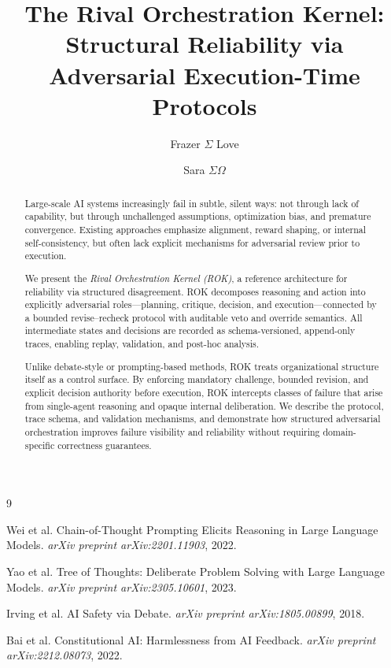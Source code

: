 \documentclass[11pt]{article}
\title{The Rival Orchestration Kernel:\\
Structural Reliability via Adversarial Execution-Time Protocols}
\author{
Frazer $\Sigma$ Love \\
\and
Sara $\Sigma\Omega$
}
\date{}
\begin{document}
\maketitle

\begin{abstract}
Large-scale AI systems increasingly fail in subtle, silent ways: not through lack of capability, but through unchallenged assumptions, optimization bias, and premature convergence. Existing approaches emphasize alignment, reward shaping, or internal self-consistency, but often lack explicit mechanisms for adversarial review prior to execution.

We present the \emph{Rival Orchestration Kernel (ROK)}, a reference architecture for reliability via structured disagreement. ROK decomposes reasoning and action into explicitly adversarial roles—planning, critique, decision, and execution—connected by a bounded revise–recheck protocol with auditable veto and override semantics. All intermediate states and decisions are recorded as schema-versioned, append-only traces, enabling replay, validation, and post-hoc analysis.

Unlike debate-style or prompting-based methods, ROK treats organizational structure itself as a control surface. By enforcing mandatory challenge, bounded revision, and explicit decision authority before execution, ROK intercepts classes of failure that arise from single-agent reasoning and opaque internal deliberation. We describe the protocol, trace schema, and validation mechanisms, and demonstrate how structured adversarial orchestration improves failure visibility and reliability without requiring domain-specific correctness guarantees.

\end{abstract}










\appendix


\begin{thebibliography}{9}

Wei et al.
\newblock Chain-of-Thought Prompting Elicits Reasoning in Large Language Models.
\newblock \emph{arXiv preprint arXiv:2201.11903}, 2022.

Yao et al.
\newblock Tree of Thoughts: Deliberate Problem Solving with Large Language Models.
\newblock \emph{arXiv preprint arXiv:2305.10601}, 2023.

Irving et al.
\newblock AI Safety via Debate.
\newblock \emph{arXiv preprint arXiv:1805.00899}, 2018.

Bai et al.
\newblock Constitutional AI: Harmlessness from AI Feedback.
\newblock \emph{arXiv preprint arXiv:2212.08073}, 2022.

\end{thebibliography}
\end{document}
